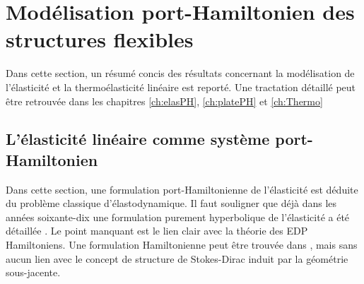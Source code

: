 \section{Mod\'elisation port-Hamiltonien des structures flexibles}
Dans cette section, un résumé concis des résultats concernant la modélisation de l'élasticité et la thermoélasticité linéaire est reporté. Une tractation détaillé peut être retrouvée dans les chapitres \ref{ch:elasPH}, \ref{ch:platePH} et \ref{ch:Thermo}


\subsection{L'élasticité linéaire comme système port-Hamiltonien}

Dans cette section, une formulation port-Hamiltonienne de l'élasticité est déduite du problème classique d'élastodynamique. Il faut souligner que déjà dans les années soixante-dix une formulation purement hyperbolique de l'élasticité a été détaillée \cite{hughes1978classical}. Le point manquant est le lien clair avec la théorie des EDP Hamiltoniens. Une formulation Hamiltonienne peut être trouvée dans \cite[Chapitre 16]{grinfield2015}, mais sans aucun lien avec le concept de structure de Stokes-Dirac induit par la géométrie sous-jacente. \\

